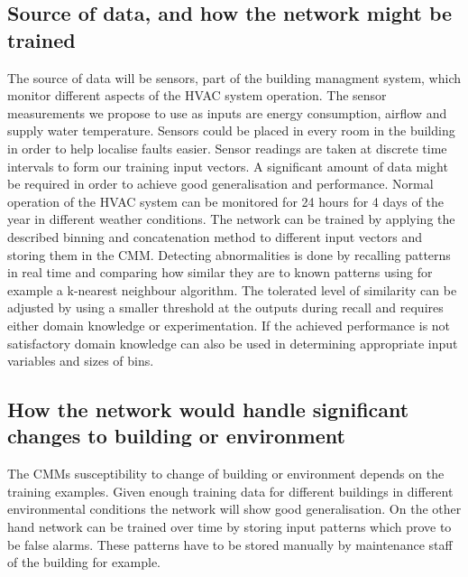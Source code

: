 \documentclass[a4paper, 11pt]{article}
\begin{document}
\subsection{Source of data, and how the network might be trained}
The source of data will be sensors, part of the building managment system, which monitor different aspects of the HVAC system operation. The sensor measurements we propose to use as inputs are energy consumption, airflow and supply water temperature. Sensors could be placed in every room in the building in order to help localise faults easier.  Sensor readings are taken at discrete time intervals to form our training input vectors. A significant amount of data might be required in order to achieve good generalisation and performance. Normal operation of the HVAC system can be monitored for 24 hours for 4 days of the year in different weather conditions. The network can be trained by applying the described binning and concatenation method to different input vectors and storing them in the CMM. Detecting abnormalities is done by recalling patterns in real time and comparing how similar they are to known patterns using for example a k-nearest neighbour algorithm. The tolerated level of similarity can be adjusted by using a smaller threshold at the outputs during recall and requires either domain knowledge or experimentation. If the achieved performance is not satisfactory domain knowledge can also be used in determining appropriate input variables and sizes of bins.
\subsection{How the network would handle significant changes to building or environment}
The CMMs susceptibility to change of building or environment depends on the training examples. Given enough training data for different buildings in different environmental conditions the network will show good generalisation. On the other hand network can be trained over time by storing input patterns which prove to be false alarms. These patterns have to be stored manually by maintenance staff of the building for example.





\pagebreak
\appendix
\appendixpage


\end{document}
